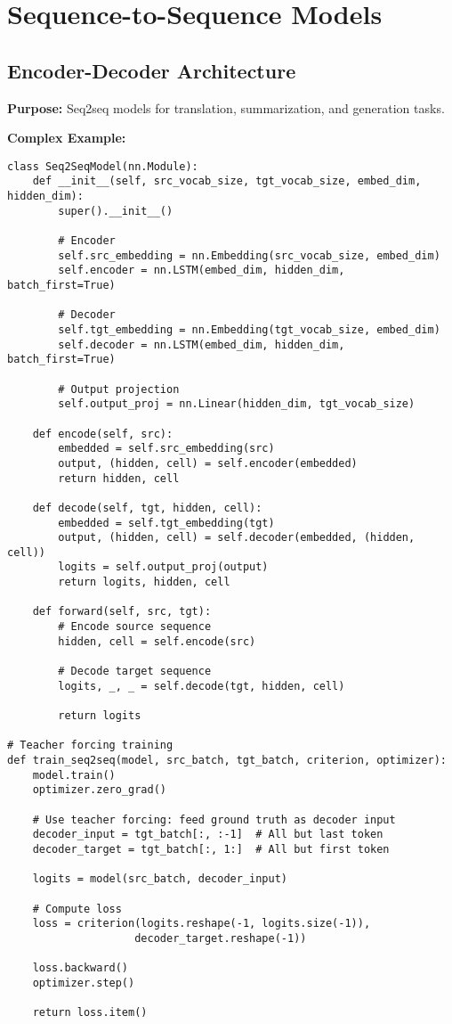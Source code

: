 \documentclass[11pt,a4paper]{book}
\begin{document}
\section{Sequence-to-Sequence Models}

\subsection{Encoder-Decoder Architecture}

\textbf{Purpose:} Seq2seq models for translation, summarization, and generation tasks.

\textbf{Complex Example:}
\begin{verbatim}
class Seq2SeqModel(nn.Module):
    def __init__(self, src_vocab_size, tgt_vocab_size, embed_dim, hidden_dim):
        super().__init__()
        
        # Encoder
        self.src_embedding = nn.Embedding(src_vocab_size, embed_dim)
        self.encoder = nn.LSTM(embed_dim, hidden_dim, batch_first=True)
        
        # Decoder
        self.tgt_embedding = nn.Embedding(tgt_vocab_size, embed_dim)
        self.decoder = nn.LSTM(embed_dim, hidden_dim, batch_first=True)
        
        # Output projection
        self.output_proj = nn.Linear(hidden_dim, tgt_vocab_size)
        
    def encode(self, src):
        embedded = self.src_embedding(src)
        output, (hidden, cell) = self.encoder(embedded)
        return hidden, cell
    
    def decode(self, tgt, hidden, cell):
        embedded = self.tgt_embedding(tgt)
        output, (hidden, cell) = self.decoder(embedded, (hidden, cell))
        logits = self.output_proj(output)
        return logits, hidden, cell
    
    def forward(self, src, tgt):
        # Encode source sequence
        hidden, cell = self.encode(src)
        
        # Decode target sequence
        logits, _, _ = self.decode(tgt, hidden, cell)
        
        return logits

# Teacher forcing training
def train_seq2seq(model, src_batch, tgt_batch, criterion, optimizer):
    model.train()
    optimizer.zero_grad()
    
    # Use teacher forcing: feed ground truth as decoder input
    decoder_input = tgt_batch[:, :-1]  # All but last token
    decoder_target = tgt_batch[:, 1:]  # All but first token
    
    logits = model(src_batch, decoder_input)
    
    # Compute loss
    loss = criterion(logits.reshape(-1, logits.size(-1)), 
                    decoder_target.reshape(-1))
    
    loss.backward()
    optimizer.step()
    
    return loss.item()
\end{verbatim}
\end{document}
